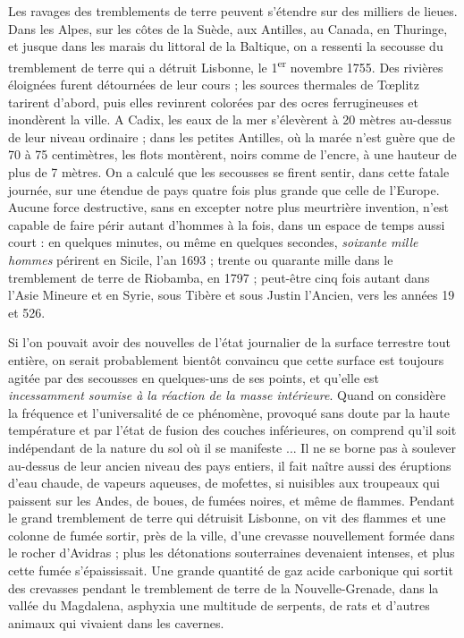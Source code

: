 \documentclass[a4paper, 11pt, oneside, landscape]{article}
\begin{document}
Les ravages des tremblements de terre peuvent s'étendre sur des milliers de lieues. Dans les Alpes, sur les côtes de la Suède, aux Antilles, au Canada, en Thuringe, et jusque dans les marais du littoral de la Baltique, on a ressenti la secousse du tremblement de terre qui a détruit Lisbonne, le 1\textsuperscript{er} novembre 1755. Des rivières éloignées furent détournées de leur cours ; les sources thermales de Tœplitz tarirent d'abord, puis elles revinrent colorées par des ocres ferrugineuses et inondèrent la ville. A Cadix, les eaux de la mer s'élevèrent à 20 mètres au-dessus de leur niveau ordinaire ; dans les petites Antilles, où la marée n'est guère que de 70 à 75 centimètres, les flots montèrent, noirs comme de l'encre, à une hauteur de plus de 7 mètres. On a calculé que les secousses se firent sentir, dans cette fatale journée, sur une étendue de pays quatre fois plus grande que celle de l'Europe. Aucune force destructive, sans en excepter notre plus meurtrière invention, n'est capable de faire périr autant d'hommes à la fois, dans un espace de temps aussi court : en quelques minutes, ou même en quelques secondes, \emph{soixante mille hommes} périrent en Sicile, l'an 1693 ; trente ou quarante mille dans le tremblement de terre de Riobamba, en 1797 ; peut-être cinq fois autant dans l'Asie Mineure et en Syrie, sous Tibère et sous Justin l'Ancien, vers les années 19 et 526.

Si l'on pouvait avoir des nouvelles de l'état journalier de la surface terrestre tout entière, on serait probablement bientôt convaincu que cette surface est toujours agitée par des secousses en quelques-uns de ses points, et qu'elle est \emph{incessamment soumise à la réaction de la masse intérieure}. Quand on considère la fréquence et l'universalité de ce phénomène, provoqué sans doute par la haute température et par l'état de fusion des couches inférieures, on comprend qu'il soit indépendant de la nature du sol où il se manifeste ... Il ne se borne pas à soulever au-dessus de leur ancien niveau des pays entiers, il fait naître aussi des éruptions d'eau chaude, de vapeurs aqueuses, de mofettes, si nuisibles aux troupeaux qui paissent sur les Andes, de boues, de fumées noires, et même de flammes. Pendant le grand tremblement de terre qui détruisit Lisbonne, on vit des flammes et une colonne de fumée sortir, près de la ville, d'une crevasse nouvellement formée dans le rocher d'Avidras ; plus les détonations souterraines devenaient intenses, et plus cette fumée s'épaississait. Une grande quantité de gaz acide carbonique qui sortit des crevasses pendant le tremblement de terre de la Nouvelle-Grenade, dans la vallée du Magdalena, asphyxia une multitude de serpents, de rats et d'autres animaux qui vivaient dans les cavernes.
\end{document}
